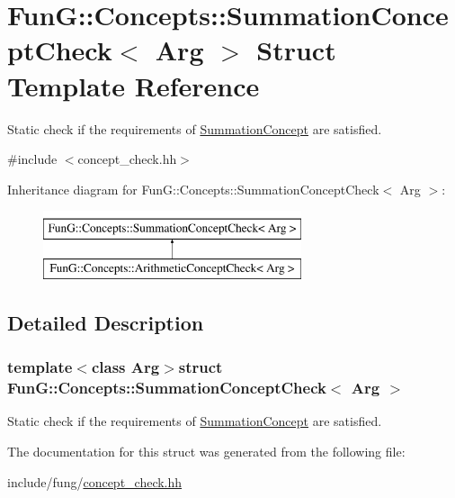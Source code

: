 \hypertarget{structFunG_1_1Concepts_1_1SummationConceptCheck}{\section{Fun\-G\-:\-:Concepts\-:\-:Summation\-Concept\-Check$<$ Arg $>$ Struct Template Reference}
\label{structFunG_1_1Concepts_1_1SummationConceptCheck}
}


Static check if the requirements of \hyperlink{structFunG_1_1Concepts_1_1SummationConcept}{Summation\-Concept} are satisfied.  




{\ttfamily \#include $<$concept\-\_\-check.\-hh$>$}

Inheritance diagram for Fun\-G\-:\-:Concepts\-:\-:Summation\-Concept\-Check$<$ Arg $>$\-:\begin{figure}[H]
\begin{center}
\leavevmode
\includegraphics[height=2.000000cm]{structFunG_1_1Concepts_1_1SummationConceptCheck}
\end{center}
\end{figure}


\subsection{Detailed Description}
\subsubsection*{template$<$class Arg$>$struct Fun\-G\-::\-Concepts\-::\-Summation\-Concept\-Check$<$ Arg $>$}

Static check if the requirements of \hyperlink{structFunG_1_1Concepts_1_1SummationConcept}{Summation\-Concept} are satisfied. 

The documentation for this struct was generated from the following file\-:\begin{DoxyCompactItemize}
\item 
include/fung/\hyperlink{concept__check_8hh}{concept\-\_\-check.\-hh}\end{DoxyCompactItemize}
